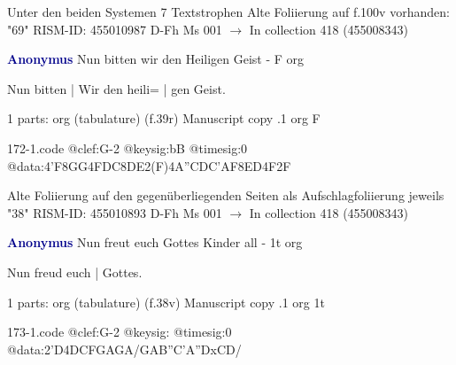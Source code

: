 \documentclass[twocolumn]{book}
\begin{document}
\newline Unter den beiden Systemen 7 Textstrophen
\newline Alte Foliierung auf f.100v vorhanden: "69"
\newline RISM-ID: 455010987
\newline D-Fh  Ms 001
\newline $\rightarrow$ In collection 418 (455008343)
      
\newline \par \vspace{7pt} \textcolor{darkblue}{\textbf{Anonymus  }}
\newline Nun bitten wir den Heiligen Geist - F
\newline org
\newline \begin{itshape}[f.39r, at left:] Nun bitten | Wir den heili= | gen Geist.\end{itshape} 
\newline \textcolor{darkblue}{}  1 parts: org (tabulature)  (f.39r)
\newline Manuscript copy
.1  org  F  
\begin{filecontents*}{172-1.code}
@clef:G-2
@keysig:bB
@timesig:0
@data:4'F{8GG}4FDC{8DE}2(F)4A''CDC'AF{8ED}4F2F
\end{filecontents*}
\newline
%

\newline Alte Foliierung auf den gegenüberliegenden Seiten als Aufschlagfoliierung jeweils "38"
\newline RISM-ID: 455010893
\newline D-Fh  Ms 001
\newline $\rightarrow$ In collection 418 (455008343)
      
\newline \par \vspace{7pt} \textcolor{darkblue}{\textbf{Anonymus  }}
\newline Nun freut euch Gottes Kinder all - 1t
\newline org
\newline \begin{itshape}[f.38v, at left:] Nun freud euch | Gottes.\end{itshape} 
\newline \textcolor{darkblue}{}  1 parts: org (tabulature)  (f.38v)
\newline Manuscript copy
.1  org  1t  
\begin{filecontents*}{173-1.code}
@clef:G-2
@keysig:
@timesig:0
@data:2'D4DCFGAGA/GAB''C'A''DxCD/
\end{filecontents*}
\newline
%
\end{document}

